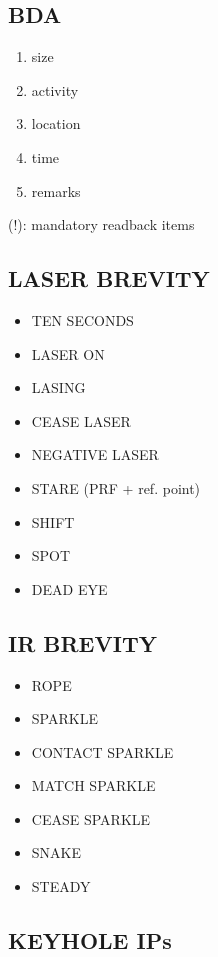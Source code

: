 \documentclass[
  7pt,
  headinclude=false,
  footinclude=false,
  portrait,
  paper=15cm:10cm,
  twocolumn,
]{scrartcl}
\begin{document}
\subsection*{BDA}
\begin{enumerate}
  \item size
  \item activity
  \item location
  \item time
  \item remarks
\end{enumerate}

\vspace*{\fill}
\noindent (!): mandatory readback items
\pagebreak

\subsection*{LASER BREVITY}
\begin{itemize}
  \item TEN SECONDS
  \item LASER ON
  \item LASING
  \item CEASE LASER
  \item NEGATIVE LASER
  \item STARE (PRF + ref. point)
  \item SHIFT
  \item SPOT
  \item DEAD EYE
\end{itemize}

\subsection*{IR BREVITY}
\begin{itemize}
  \item ROPE
  \item SPARKLE
  \item CONTACT SPARKLE
  \item MATCH SPARKLE
  \item CEASE SPARKLE
  \item SNAKE
  \item STEADY
\end{itemize}

\subsection*{KEYHOLE IPs}
\end{document}
